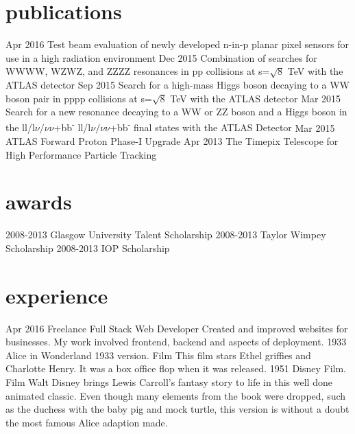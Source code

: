 \documentclass[]{twentysecondcv}
\begin{document}
\section{publications}

\begin{twentyshort}
  \twentyitemshort
    {Apr 2016}
    { Test beam evaluation of newly developed n-in-p planar pixel sensors for use in a high radiation environment}
  \twentyitemshort
    {Dec 2015}
    { Combination of searches for WWWW, WZWZ, and ZZZZ resonances in pp collisions at s=$\sqrt{8}$ TeV with the ATLAS detector}
  \twentyitemshort
    {Sep 2015}
    { Search for a high-mass Higgs boson decaying to a WW boson pair in pppp collisions at s=$\sqrt{8}$ TeV with the ATLAS detector  }
  \twentyitemshort
    {Mar 2015 }
    { Search for a new resonance decaying to a WW or ZZ boson and a Higgs boson in the ll/l$\nu/\nu\nu$+bb\textsuperscript{-} ll/l$\nu/\nu\nu$+bb\textsuperscript{-} final states with the ATLAS Detector}
  \twentyitemshort
    {Mar 2015 }
    { ATLAS Forward Proton Phase-I Upgrade }
  \twentyitemshort
    {Apr 2013 }
    { The Timepix Telescope for High Performance Particle Tracking }
\end{twentyshort}



\section{awards}

\begin{twentyshort}
  \twentyitemshort
    {2008-2013}
    {Glasgow University Talent Scholarship }
  \twentyitemshort
    {2008-2013}
    {Taylor Wimpey Scholarship }
  \twentyitemshort
    {2008-2013}
    {IOP Scholarship}
\end{twentyshort}


\section{experience}

\begin{twenty}
  \twentyitem
    {Apr 2016}
    {Freelance Full Stack Web Developer}
    {}
    {Created and improved websites for businesses. My work involved frontend, backend and aspects of deployment.}
  \twentyitem
    {1933}
    {Alice in Wonderland 1933 version.}
    {Film}
    {This film stars Ethel griffies and Charlotte Henry. It was a box office flop when it was released.}
\twentyitem
    {1951}
    {Disney Film.}
    {Film}
    {Walt Disney brings Lewis Carroll's fantasy story to life in this well done animated classic. Even though many elements from the book were dropped, such as the duchess with the baby pig and mock turtle, this version is without a doubt the most famous Alice adaption made.}

\end{twenty}
\end{document}

